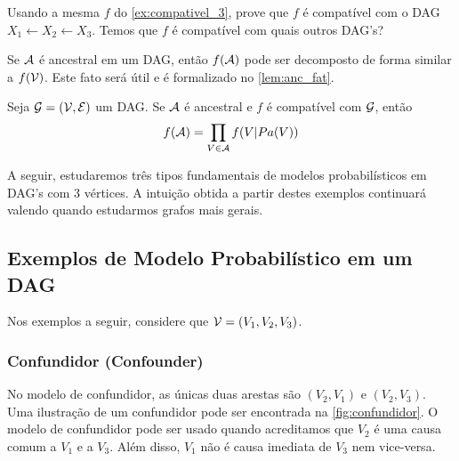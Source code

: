 \begin{exercise}
 Usando a mesma $f$ do \cref{ex:compativel_3},
 prove que $f$ é compatível com o DAG
 $X_1 \leftarrow X_2 \leftarrow X_3$.
 Temos que $f$ é compatível com quais outros DAG's?
\end{exercise}

Se ${\mathcal A}$ é ancestral em um DAG, então
$f({\mathcal A})$ pode ser decomposto de forma similar a $f({\mathcal V})$.
Este fato será útil e é
formalizado no \cref{lem:anc_fat}.

\begin{lemma}
 \label{lem:anc_fat}
 Seja ${\mathcal G} = ({\mathcal V}, {\mathcal E})$ um DAG.
 Se ${\mathcal A}$ é ancestral e 
 $f$ é compatível com ${\mathcal G}$, então
 \begin{align*}
  f({\mathcal A}) = \prod_{V \in {\mathcal A}} f(V|Pa(V))
 \end{align*}
\end{lemma}

A seguir, estudaremos três tipos fundamentais
de modelos probabilísticos em DAG's com
$3$ vértices. 
A intuição obtida a partir destes
exemplos continuará valendo quando
estudarmos grafos mais gerais.

\subsection{Exemplos de Modelo Probabilístico em um DAG}
\label{sec:dag-ex}

Nos exemplos a seguir, considere que
${\mathcal V} = (V_1, V_2, V_3)$.

\subsubsection{Confundidor (Confounder)}

No modelo de confundidor, 
as únicas duas arestas são 
$(V_2, V_1)$ e $(V_2, V_3)$.
Uma ilustração de um confundidor
pode ser encontrada 
na \cref{fig:confundidor}.
O modelo de confundidor pode ser usado quando
acreditamos que $V_2$ é uma causa comum a
$V_1$ e a $V_3$. Além disso,
$V_1$ não é causa imediata de $V_3$ 
nem vice-versa.

